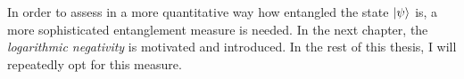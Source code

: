 In order to assess in a more quantitative way how entangled the state $\ket{\psi}$ is, a more sophisticated entanglement measure is needed. In the next chapter, the \emph{logarithmic negativity} is motivated and introduced. In the rest of this thesis, I will repeatedly opt for this measure.


